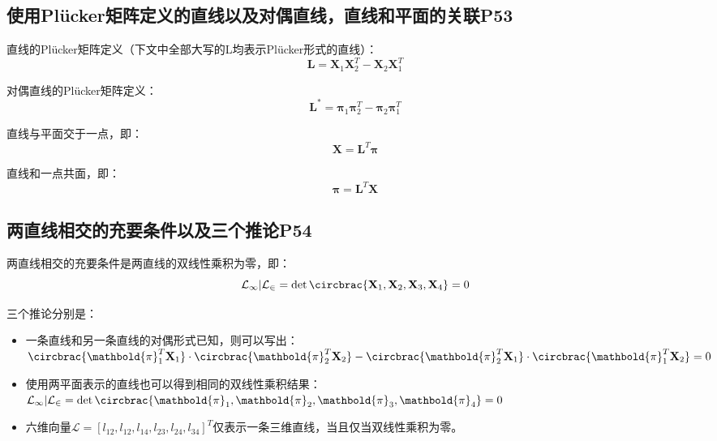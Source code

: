 \documentclass[11pt]{article}
\begin{document}
\subsection{使用Plücker矩阵定义的直线以及对偶直线，直线和平面的关联P53}
直线的Plücker矩阵定义（下文中全部大写的L均表示Plücker形式的直线）：
\begin{equation*}
  \mathbf{L}=\mathbf{X}_1\mathbf{X}_2^T-\mathbf{X}_2\mathbf{X}_1^T
\end{equation*}\par
对偶直线的Plücker矩阵定义：
\begin{equation*}
  \mathbf{L}^*=\mathbold{\pi}_1\mathbold{\pi}_2^T-\mathbold{\pi}_2\mathbold{\pi}_1^T
\end{equation*}\par
直线与平面交于一点，即：
\begin{equation*}
  \mathbf{X}=\mathbf{L}^T\mathbold{\pi}
\end{equation*}\par
直线和一点共面，即：
\begin{equation*}
  \mathbold{\pi}=\mathbf{L}^T\mathbf{X}
\end{equation*}\par
\subsection{两直线相交的充要条件以及三个推论P54}
两直线相交的充要条件是两直线的双线性乘积为零，即：
\begin{equation*}
  \mathcal{L_1|L_2}=\det\circbrac{\mathbf{X}_1,\mathbf{X}_2,\mathbf{X}_3,\mathbf{X}_4}=0
\end{equation*}\par
三个推论分别是：
\begin{itemize}
  \item 一条直线和另一条直线的对偶形式已知，则可以写出：\\
  $\circbrac{\mathbold{\pi}_1^T\mathbf{X}_1}\cdot\circbrac{\mathbold{\pi}_2^T\mathbf{X}_2}-\circbrac{\mathbold{\pi}_2^T\mathbf{X}_1}\cdot\circbrac{\mathbold{\pi}_1^T\mathbf{X}_2}=0$
  \item 使用两平面表示的直线也可以得到相同的双线性乘积结果：\\
  $\mathcal{L_1|L_2}=\det\circbrac{\mathbold{\pi}_1,\mathbold{\pi}_2,\mathbold{\pi}_3,\mathbold{\pi}_4}=0
  $
  \item 六维向量$\mathcal{L}=[l_12,l_12,l_14,l_23,l_24,l_34]^T$仅表示一条三维直线，当且仅当双线性乘积为零。
\end{itemize}
\end{document}
